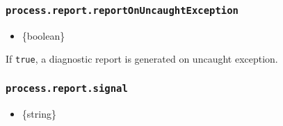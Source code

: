 \subsubsection{\texorpdfstring{\texttt{process.report.reportOnUncaughtException}}{process.report.reportOnUncaughtException}}\label{process.report.reportonuncaughtexception}

\begin{itemize}
\tightlist
\item
  \{boolean\}
\end{itemize}

If \texttt{true}, a diagnostic report is generated on uncaught
exception.

\begin{Shaded}
\begin{Highlighting}[]
 \OperatorTok{;}

\NormalTok{(}\SpecialCharTok{$\{}\SpecialCharTok{\}}\VerbatimStringTok{\textasciigrave{}}\NormalTok{)}\OperatorTok{;}
\end{Highlighting}
\end{Shaded}

\begin{Shaded}
\begin{Highlighting}[]
\OperatorTok{=} \NormalTok{(}\NormalTok{)}\OperatorTok{;}

\NormalTok{(}\SpecialCharTok{$\{}\SpecialCharTok{\}}\VerbatimStringTok{\textasciigrave{}}\NormalTok{)}\OperatorTok{;}
\end{Highlighting}
\end{Shaded}

\subsubsection{\texorpdfstring{\texttt{process.report.signal}}{process.report.signal}}\label{process.report.signal}

\begin{itemize}
\tightlist
\item
  \{string\}
\end{itemize}

